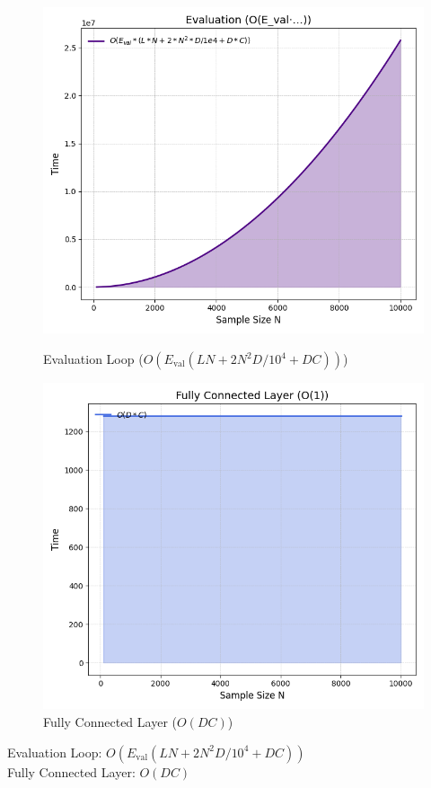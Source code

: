 \begin{figure}[H]
	\centering
	\begin{minipage}[b]{0.40\linewidth}
		\centering
		\includegraphics[width=\linewidth]{img/paper_3/evaluation_oe_val·…}
		\caption{Evaluation Loop (\(O(E_{\text{val}}(LN + 2N^2D/10^4 + DC))\))}
		\label{fig:evaluationoeval}
	\end{minipage}
	\hfill
	\begin{minipage}[b]{0.40\linewidth}
		\centering
		\includegraphics[width=\linewidth]{img/paper_3/fully_connected_layer_o1}
		\caption{Fully Connected Layer (\(O(DC)\))}
		\label{fig:fullyconnectedlayero1}
	\end{minipage}
\end{figure}

\noindent Evaluation Loop: \(O(E_{\text{val}}(LN + 2N^2D/10^4 + DC))\) \\
Fully Connected Layer: \(O(DC)\)